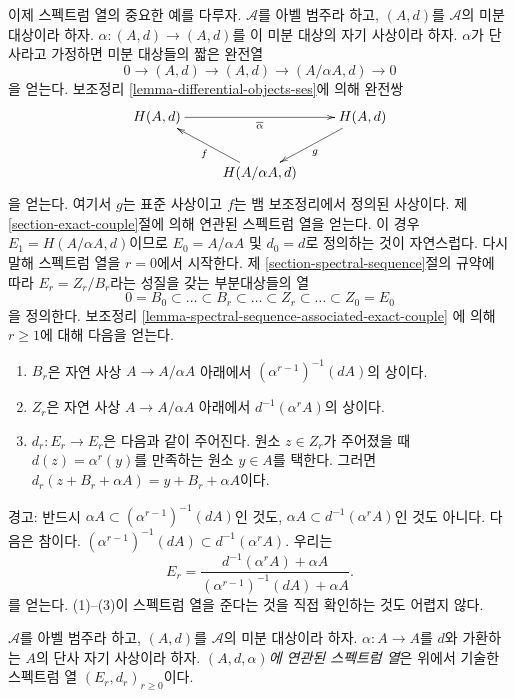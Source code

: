 \noindent
이제 스펙트럼 열의 중요한 예를 다루자. $\mathcal{A}$를 아벨 범주라
하고, $(A, d)$를 $\mathcal{A}$의 미분 대상이라 하자.
$\alpha : (A, d) \to (A, d)$를 이 미분 대상의 자기 사상이라 하자.
$\alpha$가 단사라고 가정하면 미분 대상들의 짧은 완전열
$$
0 \to (A, d) \to (A, d) \to (A/\alpha A, d) \to 0
$$
을 얻는다. 보조정리 \ref{lemma-differential-objects-ses}에 의해 완전쌍
$$
\xymatrix{
H(A, d) \ar[rr]_{\overline{\alpha}} & & H(A, d) \ar[ld]^g \\
& H(A/\alpha A, d) \ar[lu]^f &
}
$$
을 얻는다. 여기서 $g$는 표준 사상이고 $f$는 뱀 보조정리에서 정의된
사상이다. 제 \ref{section-exact-couple}절에 의해 연관된 스펙트럼 열을
얻는다. 이 경우 $E_1 = H(A/\alpha A, d)$이므로
$E_0 = A/\alpha A$ 및 $d_0 = d$로 정의하는 것이 자연스럽다.
다시 말해 스펙트럼 열을 $r = 0$에서 시작한다. 제
\ref{section-spectral-sequence}절의 규약에 따라
$E_r = Z_r/B_r$라는 성질을 갖는 부분대상들의 열
$$
0 = B_0 \subset \ldots \subset B_r \subset \ldots
\subset Z_r \subset \ldots \subset Z_0 = E_0
$$
을 정의한다. 보조정리 \ref{lemma-spectral-sequence-associated-exact-couple}
에 의해 $r \geq 1$에 대해 다음을 얻는다.
\begin{enumerate}
\item $B_r$은 자연 사상 $A \to A/\alpha A$ 아래에서
$(\alpha^{r - 1})^{-1}(d A)$의 상이다.
\item $Z_r$은 자연 사상 $A \to A/\alpha A$ 아래에서
$d^{-1}(\alpha^r A)$의 상이다.
\item $d_r : E_r \to E_r$은 다음과 같이 주어진다. 원소
$z \in Z_r$가 주어졌을 때 $d(z) = \alpha^r(y)$를 만족하는 원소
$y \in A$를 택한다. 그러면
$d_r(z + B_r + \alpha A) = y + B_r + \alpha A$이다.
\end{enumerate}
경고: 반드시 $\alpha A \subset (\alpha^{r - 1})^{-1}(dA)$인 것도,
$\alpha A \subset d^{-1}(\alpha^r A)$인 것도 아니다. 다음은 참이다.
$(\alpha^{r - 1})^{-1}(dA) \subset d^{-1}(\alpha^r A)$.
우리는
$$
E_r
=
\frac{d^{-1}(\alpha^r A) + \alpha A}{(\alpha^{r - 1})^{-1}(dA) + \alpha A}.
$$
를 얻는다. (1)--(3)이 스펙트럼 열을 준다는 것을 직접 확인하는 것도
어렵지 않다.

\begin{definition}
\label{definition-differential-object-selfmap}
$\mathcal{A}$를 아벨 범주라 하고, $(A, d)$를 $\mathcal{A}$의 미분
대상이라 하자. $\alpha : A \to A$를 $d$와 가환하는 $A$의 단사 자기
사상이라 하자. {\it $(A, d, \alpha)$에 연관된 스펙트럼 열}은 위에서
기술한 스펙트럼 열 $(E_r, d_r)_{r \geq 0}$이다.
\end{definition}

